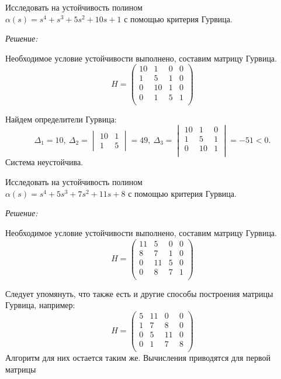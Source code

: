 \documentclass[../../TAU.tex]{subfiles}
\begin{document}
    \examp Исследовать на устойчивость полином\\
    $\alpha(s) = s^4+s^3+5s^2+10s+1$ 
    с помощью критерия Гурвица.

    {\it Решение:}\par
    Необходимое условие устойчивости выполнено, составим матрицу Гурвица.
    $$
        H = 
        \begin{pmatrix}
            10 & 1 & 0 & 0\\
            1 & 5 & 1 & 0 \\
            0 & 10 & 1 & 0\\
            0 & 1 & 5 & 1 \\
        \end{pmatrix}
    $$

    Найдем определители Гурвица: 
    $$
    \Delta_1=10,\ \Delta_2 = 
    \begin{vmatrix}
        10 & 1\\
        1  & 5
    \end{vmatrix}
    =49,\ \Delta_3=
    \begin{vmatrix}
        10 & 1 & 0\\
        1  & 5 & 1\\
        0 & 10 & 1\\
    \end{vmatrix}
    =-51<0.
    $$
    Система неустойчива.

    \examp Исследовать на устойчивость полином\\
    $\alpha(s) = s^4+5s^3+7s^2+11s+8$ 
    с помощью критерия Гурвица.

    {\it Решение:}\par
    Необходимое условие устойчивости выполнено, составим матрицу Гурвица.
    $$
        H = 
        \begin{pmatrix}
            11 & 5  & 0 & 0 \\
            8  & 7  & 1 & 0 \\
            0  & 11 & 5 & 0 \\
            0  & 8  & 7 & 1 \\
        \end{pmatrix}
    $$

    Следует упомянуть, что также есть и другие способы построения матрицы Гурвица, например:
    $$
        H = 
        \begin{pmatrix}
            5 & 11 & 0  & 0 \\
            1 & 7  & 8  & 0 \\
            0 & 5  & 11 & 0 \\
            0 & 1  & 7  & 8 \\
        \end{pmatrix}
    $$
    Алгоритм для них остается таким же. Вычисления приводятся для первой матрицы
\end{document}
